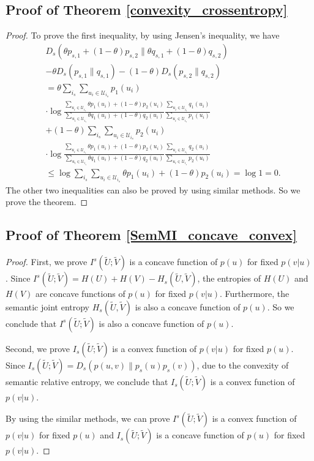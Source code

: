\documentclass[12pt, draftclsnofoot,onecolumn]{IEEEtran}
\begin{document}
\subsection{Proof of Theorem \ref{convexity_crossentropy}}\label{proof_convexity_crossentropy}
\begin{proof}
To prove the first inequality, by using Jensen's inequality, we have
\begin{equation}
\begin{aligned}
&D_s(\theta p_{s,1} + (1-\theta) p_{s,2}\| \theta q_{s,1} + (1-\theta) q_{s,2}) \\
&- \theta D_s(p_{s,1}\|q_{s,1}) -(1-\theta) D_s(p_{s,2}\|q_{s,2})\\
&=\theta \sum_{i_s}\sum_{u_i\in \mathcal{U}_{i_s}}p_1(u_i) \\
&\cdot \log \frac{\sum_{u_i\in \mathcal{U}_{i_s}}\theta p_1(u_i) + (1-\theta) p_2(u_i)}{\sum_{u_i\in \mathcal{U}_{i_s}} \theta q_1(u_i) + (1-\theta) q_2(u_i)} \frac{\sum_{u_i\in \mathcal{U}_{i_s}} q_1(u_i)}{\sum_{u_i\in \mathcal{U}_{i_s}}p_1(u_i)}\\
&+(1-\theta) \sum_{i_s}\sum_{u_i\in \mathcal{U}_{i_s}}p_2(u_i)\\
&\cdot \log \frac{\sum_{u_i\in \mathcal{U}_{i_s}}\theta p_1(u_i) + (1-\theta) p_2(u_i)}{\sum_{u_i\in \mathcal{U}_{i_s}} \theta q_1(u_i) + (1-\theta) q_2(u_i)}\frac{\sum_{u_i\in \mathcal{U}_{i_s}} q_2(u_i)}{\sum_{u_i\in \mathcal{U}_{i_s}}p_2(u_i)}\\
&\leq \log \sum_{i_s}\sum_{u_i\in \mathcal{U}_{i_s}}\theta p_1(u_i) + (1-\theta) p_2(u_i)=\log 1=0.
\end{aligned}
\end{equation}
The other two inequalities can also be proved by using similar methods. So we prove the theorem.
\end{proof}

\subsection{Proof of Theorem \ref{SemMI_concave_convex}}\label{proof_SemMI_concabe_convex}
\begin{proof}
First, we prove $I^s(\tilde{U};\tilde{V})$ is a concave function of $p(u)$ for fixed $p(v|u)$. Since $I^s(\tilde{U};\tilde{V})=H(U)+H(V)-H_s(\tilde{U},\tilde{V})$, the entropies of $H(U)$ and $H(V)$ are concave functions of $p(u)$ for fixed $p(v|u)$. Furthermore, the semantic joint entropy $H_s(\tilde{U},\tilde{V})$ is also a concave function of $p(u)$. So we conclude that $I^s(\tilde{U};\tilde{V})$ is also a concave function of $p(u)$.

Second, we prove $I_s(\tilde{U};\tilde{V})$ is a convex function of $p(v|u)$ for fixed $p(u)$. Since $I_s(\tilde{U};\tilde{V})=D_s\left(p\left(u,v\right)\|p_s(u)p_s(v)\right)$, due to the convexity of semantic relative entropy, we conclude that $I_s(\tilde{U};\tilde{V})$ is a convex function of $p(v|u)$.

By using the similar methods, we can prove $I^s(\tilde{U};\tilde{V})$ is a convex function of $p(v|u)$ for fixed $p(u)$ and $I_s(\tilde{U};\tilde{V})$ is a concave function of $p(u)$ for fixed $p(v|u)$.
\end{proof}
\end{document}
